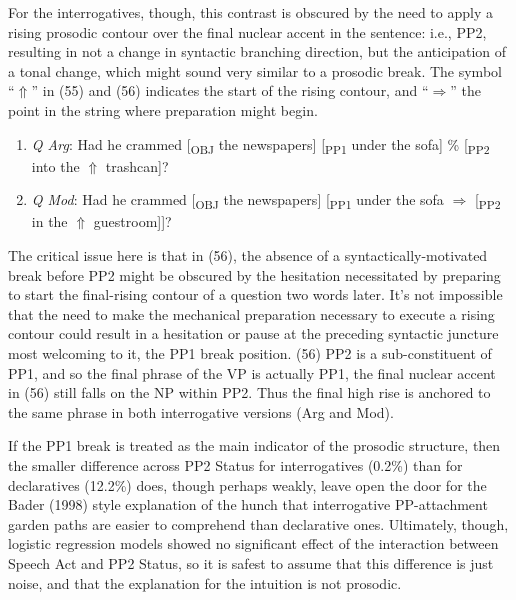 \documentclass[12pt,oneside]{book}
\providecommand{\tightlist}{%
  \setlength{\itemsep}{0pt}\setlength{\parskip}{0pt}}
\begin{document}
For the interrogatives, though, this contrast is obscured by the need to apply a rising prosodic contour over the final nuclear accent in the sentence: i.e., PP2, resulting in not a change in syntactic branching direction, but the anticipation of a tonal change, which might sound very similar to a prosodic break. The symbol ``\(\Uparrow\)'' in (55) and (56) indicates the start of the rising contour, and ``\(\Rightarrow\)'' the point in the string where preparation might begin.

\begin{enumerate}
\def\labelenumi{(\arabic{enumi})}
\setcounter{enumi}{54}
\tightlist
\item
  \emph{Q Arg}: Had he crammed {[}\textsubscript{OBJ} the newspapers{]} {[}\textsubscript{PP1} under the sofa{]} \% {[}\textsubscript{PP2} into the \(\Uparrow\) trashcan{]}?
\item
  \emph{Q Mod}: Had he crammed {[}\textsubscript{OBJ} the newspapers{]} {[}\textsubscript{PP1} under the sofa \(\Rightarrow\) {[}\textsubscript{PP2} in the \(\Uparrow\) guestroom{]}{]}?
\end{enumerate}

The critical issue here is that in (56), the absence of a syntactically-motivated break before PP2 might be obscured by the hesitation necessitated by preparing to start the final-rising contour of a question two words later. It's not impossible that the need to make the mechanical preparation necessary to execute a rising contour could result in a hesitation or pause at the preceding syntactic juncture most welcoming to it, the PP1 break position.  (56) PP2 is a sub-constituent of PP1, and so the final phrase of the VP is actually PP1, the final nuclear accent in (56) still falls on the NP within PP2. Thus the final high rise is anchored to the same phrase in both interrogative versions (Arg and Mod).

If the PP1 break is treated as the main indicator of the prosodic structure, then the smaller difference across PP2 Status for interrogatives (0.2\%) than for declaratives (12.2\%) does, though perhaps weakly, leave open the door for the Bader (1998) style explanation of the hunch that interrogative PP-attachment garden paths are easier to comprehend than declarative ones. Ultimately, though, logistic regression models showed no significant effect of the interaction between Speech Act and PP2 Status, so it is safest to assume that this difference is just noise, and that the explanation for the intuition is not prosodic.
\end{document}
